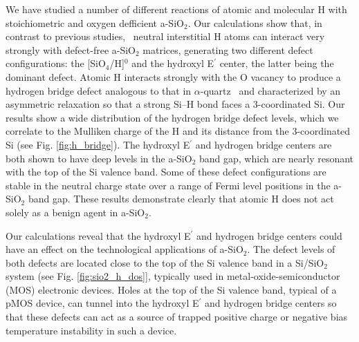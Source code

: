 \documentclass[aps,prb,reprint,superscriptaddress,showpacs]{revtex4-1}
\begin{document}
We have studied a number of different reactions of atomic and molecular H with stoichiometric and oxygen defficient a-SiO$_2$. Our calculations show that, in contrast to previous studies,~\cite{blochl_vacancies,robertson_oxides,godet_hydrogen} neutral interstitial H atoms can interact very strongly with defect-free a-SiO$_2$ matrices, generating two different defect configurations: the [SiO$_4$/H]$^0$ and the hydroxyl E$^\prime$ center, the latter being the dominant defect. Atomic H interacts strongly with the O vacancy to produce a hydrogen bridge defect analogous to that in $\alpha$-quartz~\cite{blochl_vacancies} and characterized by an asymmetric relaxation so that a strong \mbox{Si--H} bond faces a 3-coordinated Si. Our results show a wide distribution of the hydrogen bridge defect levels, which we correlate to the Mulliken charge of the H and its distance from the 3-coordinated Si (see Fig. \ref{fig:h_bridge}). The hydroxyl E$^\prime$ and hydrogen bridge centers are both shown to have deep levels in the a-SiO$_2$ band gap, which are nearly resonant with the top of the Si valence band. Some of these defect configurations are stable in the neutral charge state over a range of Fermi level positions in the a-SiO$_2$ band gap. These results demonstrate clearly that atomic H does not act solely as a benign agent in a-SiO$_2$.

Our calculations reveal that the hydroxyl E$^\prime$ and hydrogen bridge centers could have an effect on the technological applications of a-SiO$_2$. The defect levels of both defects are located close to the top of the Si valence band in a Si/SiO$_2$ system (see Fig. \ref{fig:sio2_h_dos}], typically used in metal-oxide-semiconductor (MOS) electronic devices. Holes at the top of the Si valence band, typical of a pMOS device, can tunnel into the hydroxyl E$^\prime$ and hydrogen bridge centers so that these defects can act as a source of trapped positive charge or negative bias temperature instability in such a device.
\end{document}

